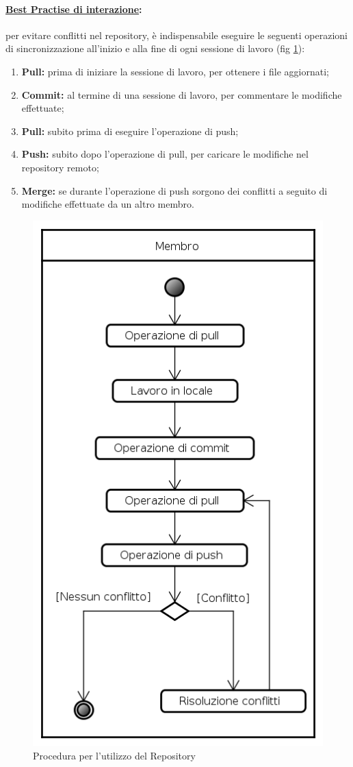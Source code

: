 \paragraph{\underline{Best Practise di interazione}:} per evitare conflitti nel repository\g{}, è indispensabile eseguire le seguenti operazioni di sincronizzazione all'inizio e alla fine di ogni sessione di lavoro (fig \ref{usorepo}):
\begin{enumerate}
\item \textbf{Pull:} prima di iniziare la sessione di lavoro, per ottenere i file aggiornati;
\item \textbf{Commit:} al termine di una sessione di lavoro, per commentare le modifiche effettuate;
\item \textbf{Pull:} subito prima di eseguire l'operazione di push;
\item \textbf{Push:} subito dopo l'operazione di pull, per caricare le modifiche nel repository\glossario{} remoto;
\item \textbf{Merge:} se durante l'operazione di push sorgono dei conflitti a seguito di modifiche effettuate da un altro membro.
\end{enumerate}
\begin{figure}[!h]
	\centering
	\includegraphics[scale=0.5]{./content/Immagini/Utilizzo_Repository.png}
	\caption{Procedura per l'utilizzo del Repository}
	\label{usorepo}
\end{figure}
